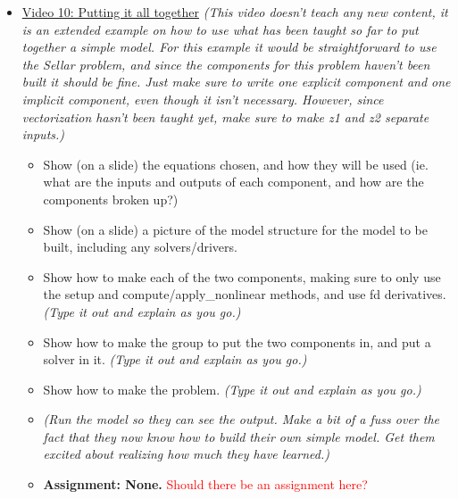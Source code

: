 \documentclass[12pt, letterpaper]{article}
\begin{document}
\begin{itemize}
	\item \underline{Video 10: Putting it all together} \textit{(This video doesn’t teach any new content, it is an extended example on how to use what has been taught so far to put together a simple model. For this example it would be straightforward to use the Sellar problem, and since the components for this problem haven't been built it should be fine. Just make sure to write one explicit component and one implicit component, even though it isn't necessary. However, since vectorization hasn't been taught yet, make sure to make z1 and z2 separate inputs.)}
		\begin{itemize}
			\item Show (on a slide) the equations chosen, and how they will be used (ie. what are the inputs and outputs of each component, and how are the components broken up?)
			\item Show (on a slide) a picture of the model structure for the model to be built, including any solvers/drivers.
			\item Show how to make each of the two components, making sure to only use the setup and compute/apply\_nonlinear methods, and use fd derivatives. \textit{(Type it out and explain as you go.)}
			\item Show how to make the group to put the two components in, and put a solver in it. \textit{(Type it out and explain as you go.)}
			\item Show how to make the problem. \textit{(Type it out and explain as you go.)}
			\item \textit{(Run the model so they can see the output. Make a bit of a fuss over the fact that they now know how to build their own simple model. Get them excited about realizing how much they have learned.)}
			\item \textbf{Assignment: None.} \textcolor{red}{Should there be an assignment here?}
		\end{itemize}
		

\end{itemize}
\end{document}
